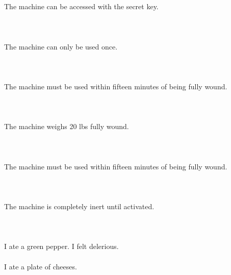 \documentclass{article}
\begin{document}
    \section{}
    The machine can be accessed with the secret key.\\\\ 
    \newpage
    
    \section{}
    The machine can only be used once.\\\\ 
    \newpage
    
    \section{}
    The machine must be used within fifteen minutes of being fully wound.\\\\ 
    \newpage
    
    \section{}
    The machine weighs 20 lbs fully wound.\\\\ 
    \newpage
    
    \section{}
    The machine must be used within fifteen minutes of being fully wound.\\\\ 
    \newpage
    
    \section{}
    The machine is completely inert until activated.\\\\ 
    \newpage
    
    \section{}
    I ate a green pepper. I felt delerious.\\\\I ate a plate of cheeses.\\\\ 
    \newpage
    
\end{document}
